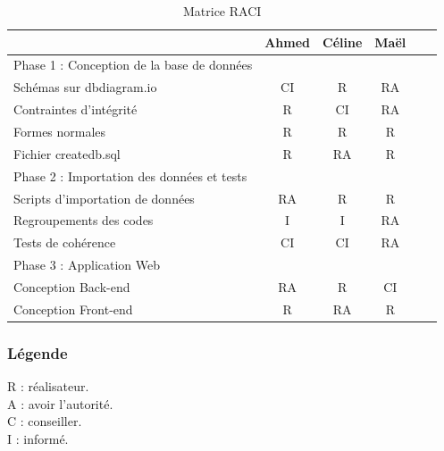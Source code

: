 \documentclass[12pt]{article}
\begin{document}
\begin{table}[!h]
    \centering
    \begin{tabular}{|l|c|c|c|c|l|}
         \hline
         & \textbf{Ahmed} & \textbf{Céline} & \textbf{Maël}    \\
         \hline
         \hline
        Phase 1 : Conception de la base de données \\
         \hline
         \hline
         Schémas sur dbdiagram.io & CI & R & RA   \\
         \hline
         Contraintes d'intégrité & R & CI & RA  \\
         \hline
         Formes normales & R & R & R  \\
         \hline
         Fichier createdb.sql & R & RA & R  \\
         \hline
         \hline
         Phase 2 : Importation des données et tests \\
        \hline
        \hline
        Scripts d'importation de données & RA & R & R \\
        \hline
        Regroupements des codes & I & I & RA \\
        \hline
        Tests de cohérence & CI & CI & RA \\
        \hline
        \hline
        Phase 3 : Application Web \\
        \hline
        \hline
        Conception Back-end & RA & R & CI \\
        \hline

        Conception Front-end & R & RA & R \\

        \hline
        
    \end{tabular}
    \caption{Matrice RACI}
    \label{tab:raci}
\end{table}

 
    \subsubsection*{Légende}
    \noindent R : réalisateur. \\
    A : avoir l'autorité. \\
    C : conseiller. \\
    I : informé. \\

\end{document}
